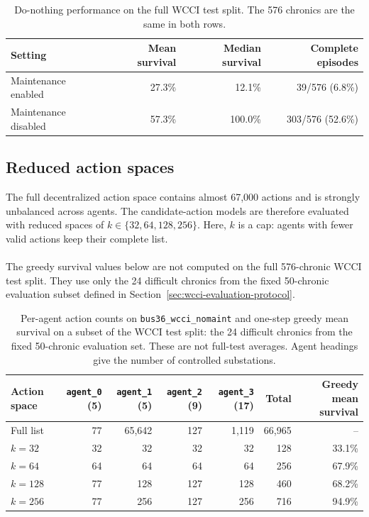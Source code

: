 \begin{table}[H]
  \centering
  \small
  \caption{Do-nothing performance on the full WCCI test split. The 576
  chronics are the same in both rows.}
  \label{tab:wcci-maintenance-effect}
  \setlength{\tabcolsep}{7pt}
  \begin{tabular}{lrrr}
    \toprule
    Setting & Mean survival & Median survival & Complete episodes \\
    \midrule
    Maintenance enabled  & 27.3\% & 12.1\%  & 39/576 (6.8\%) \\
    Maintenance disabled & 57.3\% & 100.0\% & 303/576 (52.6\%) \\
    \bottomrule
  \end{tabular}
\end{table}

\subsection{Reduced action spaces}
\label{sec:wcci-action-space}

The full decentralized action space contains almost 67{,}000 actions and is
strongly unbalanced across agents. The candidate-action models are therefore
evaluated with reduced spaces of $k\in\{32,64,128,256\}$. Here, $k$ is a cap:
agents with fewer valid actions keep their complete list.
\\
\\
The greedy survival values below are not computed on the full
576-chronic WCCI test split. They use only the 24 difficult chronics from the
fixed 50-chronic evaluation subset defined in
Section~\ref{sec:wcci-evaluation-protocol}.

\begin{table}[H]
  \centering
  \small
  \caption{Per-agent action counts on \texttt{bus36\_wcci\_nomaint} and
  one-step greedy mean survival on a subset of the WCCI test split:
  the 24 difficult chronics from the fixed 50-chronic evaluation set. These are
  not full-test averages. Agent headings give the number of controlled
  substations.}
  \label{tab:wcci-action-space}
  \setlength{\tabcolsep}{5pt}
  \begin{tabular}{lrrrrrr}
    \toprule
    Action space
      & \texttt{agent\_0} (5)
      & \texttt{agent\_1} (5)
      & \texttt{agent\_2} (9)
      & \texttt{agent\_3} (17)
      & Total
      & Greedy mean survival \\
    \midrule
    Full list & 77 & 65{,}642 & 127 & 1{,}119 & 66{,}965 & -- \\
    $k=32$   & 32 & 32  & 32  & 32  & 128 & 33.1\% \\
    $k=64$   & 64 & 64  & 64  & 64  & 256 & 67.9\% \\
    $k=128$  & 77 & 128 & 127 & 128 & 460 & 68.2\% \\
    $k=256$  & 77 & 256 & 127 & 256 & 716 & 94.9\% \\
    \bottomrule
  \end{tabular}
\end{table}

